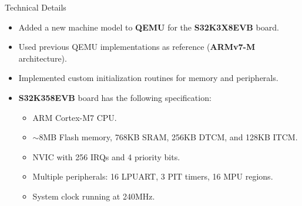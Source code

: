 \begin{frame}{Technical Details}
    \begin{itemize}
        \item Added a new machine model to \textbf{QEMU} for the \textbf{S32K3X8EVB} board.
        \item Used previous QEMU implementations as reference (\textbf{ARMv7-M} architecture).
        \item Implemented custom initialization routines for memory and peripherals.
        \item \textbf{S32K358EVB} board has the following specification:
            \begin{itemize}
                \item ARM Cortex-M7 CPU.
                \item \(\sim \)8MB Flash memory, 768KB SRAM, 256KB DTCM, and 128KB ITCM.
                \item NVIC with 256 IRQs and 4 priority bits.
                \item Multiple peripherals: 16 LPUART, 3 PIT timers, 16 MPU regions.
                \item System clock running at 240MHz.
            \end{itemize}
    \end{itemize}
\end{frame}

